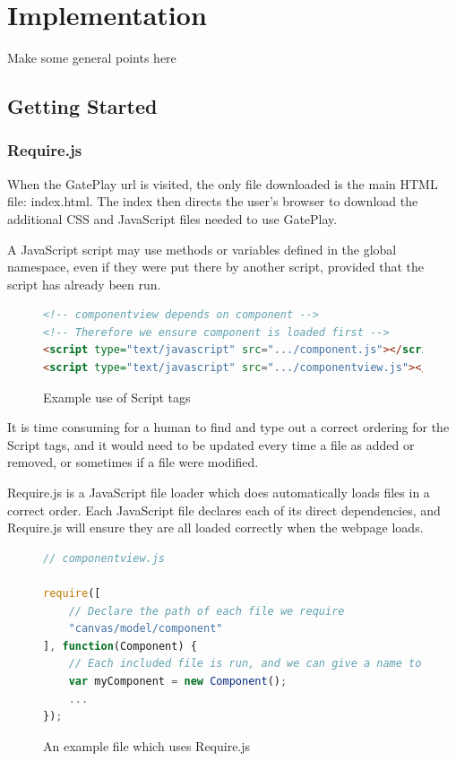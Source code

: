 \chapter{Implementation}
\label{chapter:implementation}
Make some general points here

\section{Getting Started}

\subsection{Require.js}
When the GatePlay url is visited, the only file downloaded is the main HTML file: index.html. The index then directs the user's browser to download the additional CSS and JavaScript files needed to use GatePlay.

A JavaScript script may use methods or variables defined in the global namespace, even if they were put there by another script, provided that the script has already been run.

\begin{figure}[H]
\begin{lstlisting}[language=html]
<!-- componentview depends on component -->
<!-- Therefore we ensure component is loaded first -->
<script type="text/javascript" src=".../component.js"></script>
<script type="text/javascript" src=".../componentview.js"></script>
\end{lstlisting}
\caption{Example use of Script tags}
\end{figure}

It is time consuming for a human to find and type out a correct ordering for the Script tags, and it would need to be updated every time a file as added or removed, or sometimes if a file were modified.

Require.js is a JavaScript file loader which does automatically loads files in a correct order. Each JavaScript file declares each of its direct dependencies, and Require.js will ensure they are all loaded correctly when the webpage loads.

\begin{figure}[H]
\begin{lstlisting}[language=JavaScript]
// componentview.js

require([
	// Declare the path of each file we require	
	"canvas/model/component"
], function(Component) {
	// Each included file is run, and we can give a name to whatever it returns if desired
	var myComponent = new Component();
	...
});
\end{lstlisting}
\caption{An example file which uses Require.js}
\end{figure}

